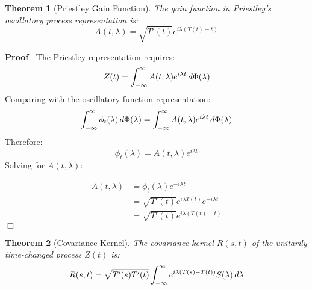 \documentclass{article}
\newenvironment{proof}{\noindent\textbf{Proof\ }}{\hspace*{\fill}$\Box$\medskip}
\newtheorem{theorem}{Theorem}
\begin{document}
\begin{theorem}
  [Priestley Gain Function] The gain function in Priestley's oscillatory
  process representation is:
  \begin{equation}
    A (t, \lambda) = \sqrt{T' (t)} e^{i \lambda (T (t) - t)}
  \end{equation}
\end{theorem}

\begin{proof}
  The Priestley representation requires:
  \begin{equation}
    Z (t) = \int_{- \infty}^{\infty} A (t, \lambda) e^{i \lambda t} 
    \hspace{0.17em} d \Phi (\lambda)
  \end{equation}
  Comparing with the oscillatory function representation:
  \begin{equation}
    \int_{- \infty}^{\infty} \phi_t (\lambda)  \hspace{0.17em} d \Phi
    (\lambda) = \int_{- \infty}^{\infty} A (t, \lambda) e^{i \lambda t} 
    \hspace{0.17em} d \Phi (\lambda)
  \end{equation}
  Therefore:
  \begin{equation}
    \phi_t (\lambda) = A (t, \lambda) e^{i \lambda t}
  \end{equation}
  Solving for $A (t, \lambda)$:
  
  \begin{align}
    A (t, \lambda) & = \phi_t (\lambda) e^{- i \lambda t} \\
    & = \sqrt{T' (t)} e^{i \lambda T (t)} e^{- i \lambda t} \\
    & = \sqrt{T' (t)} e^{i \lambda (T (t) - t)} 
  \end{align}
\end{proof}

\begin{theorem}
  [Covariance Kernel] The covariance kernel $R (s, t)$ of the unitarily
  time-changed process $Z (t)$ is:
  \[ R (s, t) = \sqrt{T' (s) T' (t)}  \int_{- \infty}^{\infty} e^{i \lambda (T
     (s) - T (t))} S (\lambda)  \hspace{0.17em} d \lambda \]
\end{theorem}
\end{document}
